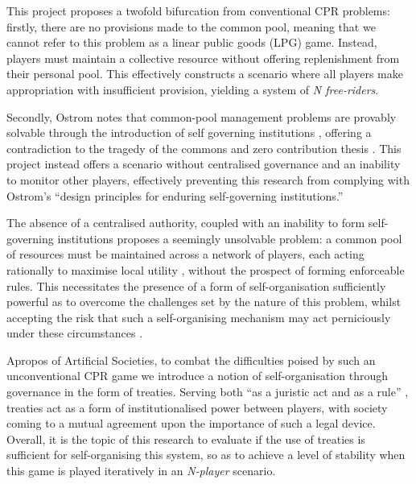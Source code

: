 This project proposes a twofold bifurcation from conventional CPR problems: firstly, there are no provisions made to the common pool, meaning that we cannot refer to this problem as a linear public goods (LPG) game. Instead, players must maintain a collective resource without offering replenishment from their personal pool. This effectively constructs a scenario where all players make appropriation with insufficient provision, yielding a system of \textit{N free-riders}. 

Secondly, Ostrom notes that common-pool management problems are provably solvable through the introduction of self governing institutions \cite{ostromCollectiveAction}, offering a contradiction to the tragedy of the commons and zero contribution thesis \cite{zeroCon}. This project instead offers a scenario without centralised governance and an inability to monitor other players, effectively preventing this research from complying with Ostrom’s ``design principles for enduring self-governing institutions.''

The absence of a centralised authority, coupled with an inability to form self-governing institutions proposes a seemingly unsolvable problem: a common pool of resources must be maintained across a network of players, each acting rationally to maximise local utility \cite{oberUtil}, without the prospect of forming enforceable rules. This necessitates the presence of a form of self-organisation sufficiently powerful as to overcome the challenges set by the nature of this problem, whilst accepting the risk that such a self-organising mechanism may act perniciously under these circumstances \cite{dobSteg}.

Apropos of Artificial Societies, to combat the difficulties poised by such an unconventional CPR game we introduce a notion of self-organisation through governance in the form of treaties. Serving both ``as a juristic act and as a rule'' \cite{reuter1995introduction}, treaties act as a form of institutionalised power between players, with society coming to a mutual agreement upon the importance of such a legal device. Overall, it is the topic of this research to evaluate if the use of treaties is sufficient for self-organising this system, so as to achieve a level of stability when this game is played iteratively in an \textit{N-player} scenario.